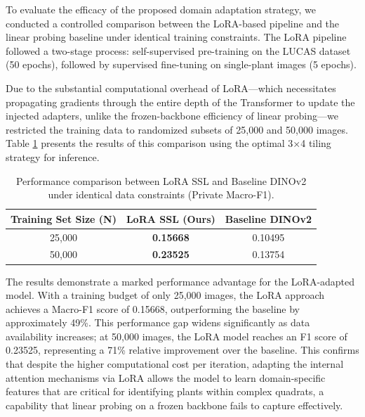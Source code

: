 \documentclass[conference]{IEEEtran}
\begin{document}
To evaluate the efficacy of the proposed domain adaptation strategy, we conducted a controlled comparison between the LoRA-based pipeline and the linear probing baseline under identical training constraints. The LoRA pipeline followed a two-stage process: self-supervised pre-training on the LUCAS dataset (50 epochs), followed by supervised fine-tuning on single-plant images (5 epochs).

Due to the substantial computational overhead of LoRA—which necessitates propagating gradients through the entire depth of the Transformer to update the injected adapters, unlike the frozen-backbone efficiency of linear probing—we restricted the training data to randomized subsets of 25,000 and 50,000 images. Table \ref{tab:lora_v_dino} presents the results of this comparison using the optimal 3×4 tiling strategy for inference.

\begin{table}[H] 
    \centering 
    \caption{Performance comparison between LoRA SSL and Baseline DINOv2 under identical data constraints (Private Macro-F1).} 
    \label{tab:lora_v_dino} 
    \begin{tabular}{@{}ccc@{}} 
        \toprule 
        \textbf{Training Set Size (N)} & \textbf{LoRA SSL (Ours)} & \textbf{Baseline DINOv2} \\ \midrule 
        25,000                         & \textbf{0.15668}         & 0.10495                  \\ 
        50,000                         & \textbf{0.23525}         & 0.13754                  \\ \bottomrule 
    \end{tabular}
\end{table}

The results demonstrate a marked performance advantage for the LoRA-adapted model. With a training budget of only 25,000 images, the LoRA approach achieves a Macro-F1 score of 0.15668, outperforming the baseline by approximately 49\%. This performance gap widens significantly as data availability increases; at 50,000 images, the LoRA model reaches an F1 score of 0.23525, representing a 71\% relative improvement over the baseline. This confirms that despite the higher computational cost per iteration, adapting the internal attention mechanisms via LoRA allows the model to learn domain-specific features that are critical for identifying plants within complex quadrats, a capability that linear probing on a frozen backbone fails to capture effectively.
\end{document}

